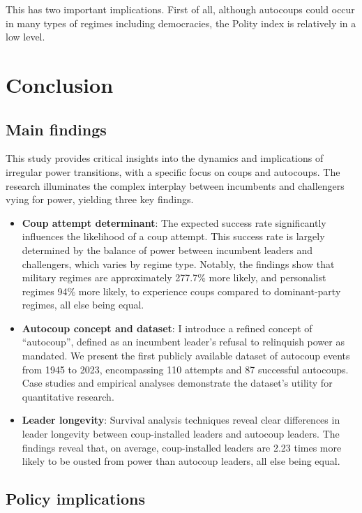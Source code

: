 \documentclass[
  12pt,
]{report}
\begin{document}
This has two important implications. First of all, although autocoups
could occur in many types of regimes including democracies, the Polity
index is relatively in a low level.

\chapter{Conclusion}\label{conclusion}

\section{Main findings}\label{main-findings}

This study provides critical insights into the dynamics and implications
of irregular power transitions, with a specific focus on coups and
autocoups. The research illuminates the complex interplay between
incumbents and challengers vying for power, yielding three key findings.

\begin{itemize}
\item
  \textbf{Coup attempt determinant}: The expected success rate
  significantly influences the likelihood of a coup attempt. This
  success rate is largely determined by the balance of power between
  incumbent leaders and challengers, which varies by regime type.
  Notably, the findings show that military regimes are approximately
  277.7\% more likely, and personalist regimes 94\% more likely, to
  experience coups compared to dominant-party regimes, all else being
  equal.
\item
  \textbf{Autocoup concept and dataset}: I introduce a refined concept
  of ``autocoup'', defined as an incumbent leader's refusal to
  relinquish power as mandated. We present the first publicly available
  dataset of autocoup events from 1945 to 2023, encompassing 110
  attempts and 87 successful autocoups. Case studies and empirical
  analyses demonstrate the dataset's utility for quantitative research.
\item
  \textbf{Leader longevity}: Survival analysis techniques reveal clear
  differences in leader longevity between coup-installed leaders and
  autocoup leaders. The findings reveal that, on average, coup-installed
  leaders are 2.23 times more likely to be ousted from power than
  autocoup leaders, all else being equal.
\end{itemize}

\section{Policy implications}\label{policy-implications-1}
\end{document}
